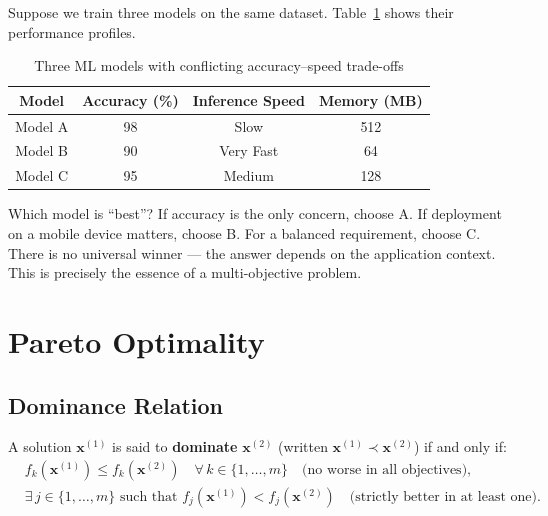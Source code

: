 \documentclass[12pt,a4paper]{article}
\begin{document}
Suppose we train three models on the same dataset. Table~\ref{tab:ml_models} shows their performance profiles.

\begin{table}[H]
\centering
\caption{Three ML models with conflicting accuracy--speed trade-offs}
\label{tab:ml_models}
\renewcommand{\arraystretch}{1.3}
\begin{tabular}{cccc}
\toprule
\textbf{Model} & \textbf{Accuracy (\%)} & \textbf{Inference Speed} & \textbf{Memory (MB)} \\
\midrule
Model A & 98 & Slow   & 512 \\
Model B & 90 & Very Fast & 64  \\
Model C & 95 & Medium    & 128 \\
\bottomrule
\end{tabular}
\end{table}

Which model is ``best''? If accuracy is the only concern, choose A. If deployment on a mobile device matters, choose B. For a balanced requirement, choose C. There is no universal winner --- the answer depends on the application context. This is precisely the essence of a multi-objective problem.

\section{Pareto Optimality}
\label{sec:pareto}

\subsection{Dominance Relation}

\begin{definition}
A solution $\mathbf{x}^{(1)}$ is said to \textbf{dominate} $\mathbf{x}^{(2)}$ (written $\mathbf{x}^{(1)} \prec \mathbf{x}^{(2)}$) if and only if:
\begin{align}
    &f_k(\mathbf{x}^{(1)}) \leq f_k(\mathbf{x}^{(2)}) \quad \forall\, k \in \{1, \ldots, m\} \quad \text{(no worse in all objectives)}, \label{eq:dom1}\\
    &\exists\, j \in \{1, \ldots, m\} \text{ such that } f_j(\mathbf{x}^{(1)}) < f_j(\mathbf{x}^{(2)}) \quad \text{(strictly better in at least one)}.
    \label{eq:dom2}
\end{align}
\end{definition}
\end{document}
